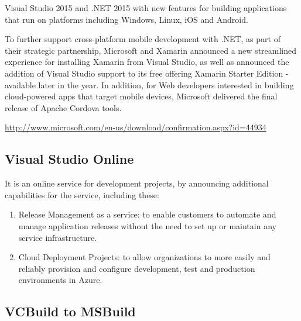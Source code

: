 Visual Studio 2015 and .NET 2015 with new features for building applications
that run on platforms including Windows, Linux, iOS and Android.

To further support cross-platform mobile development with .NET, as part of their
strategic partnership, Microsoft and Xamarin announced a new streamlined
experience for installing Xamarin from Visual Studio, as well as announced the
addition of Visual Studio support to its free offering Xamarin Starter Edition -
available later in the year. In addition, for Web developers interested in
building cloud-powered apps that target mobile devices, Microsoft delivered the
final release of Apache Cordova tools.

\url{http://www.microsoft.com/en-us/download/confirmation.aspx?id=44934}

\subsection{Visual Studio Online}

It is an online service for development projects, by announcing additional
capabilities for the service, including these:
\begin{enumerate}
  \item Release Management as a service: 
   to enable customers to automate and manage application releases without the
   need to set up or maintain any service infrastructure.
  
  \item Cloud Deployment Projects:  to allow organizations to more easily and
  reliably provision and configure development, test and production environments
  in Azure. 
\end{enumerate}


\subsection{VCBuild to MSBuild}

